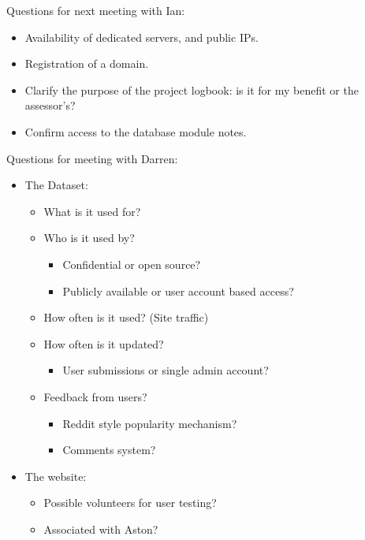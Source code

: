 \noindent
Questions for next meeting with Ian:
\begin{itemize}
\item Availability of dedicated servers, and public IPs.
\item Registration of a domain.
\item Clarify the purpose of the project logbook: is it for my benefit or the
  assessor’s?
\item Confirm access to the database module notes.
\end{itemize}

\noindent
Questions for meeting with Darren:

\begin{itemize}
\item The Dataset:
  \begin{itemize}
  \item What is it used for?
  \item Who is it used by?
    \begin{itemize}
    \item Confidential or open source?
    \item Publicly available or user account based access?
    \end{itemize}
  \item How often is it used? (Site traffic)
  \item How often is it updated?
    \begin{itemize}
    \item User submissions or single admin account?
    \end{itemize}
  \item Feedback from users?
    \begin{itemize}
    \item Reddit style popularity mechanism?
    \item Comments system?
    \end{itemize}
  \end{itemize}
\item The website:
  \begin{itemize}
  \item Possible volunteers for user testing?
  \item Associated with Aston?
  \end{itemize}
\end{itemize}

